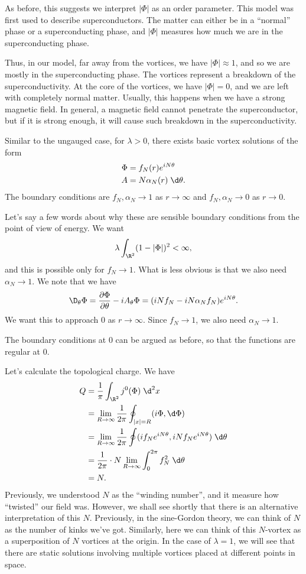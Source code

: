 \documentclass[a4paper]{article}
\begin{document}
As before, this suggests we interpret $|\Phi|$ as an order parameter. This model was first used to describe superconductors. The matter can either be in a ``normal'' phase or a superconducting phase, and $|\Phi|$ measures how much we are in the superconducting phase.

Thus, in our model, far away from the vortices, we have $|\Phi| \approx 1$, and so we are mostly in the superconducting phase. The vortices represent a breakdown of the superconductivity. At the core of the vortices, we have $|\Phi| = 0$, and we are left with completely normal matter. Usually, this happens when we have a strong magnetic field. In general, a magnetic field cannot penetrate the superconductor, but if it is strong enough, it will cause such breakdown in the superconductivity.

Similar to the ungauged case, for $\lambda > 0$, there exists basic vortex solutions of the form
\begin{align*}
  \Phi &= f_N(r) e^{iN\theta}\\
  A &= N \alpha_N(r) \;\d \theta.
\end{align*}
The boundary conditions are $f_N, \alpha_N \to 1$ as $r \to \infty$ and $f_N, \alpha_N\to 0$ as $r \to 0$.

Let's say a few words about why these are sensible boundary conditions from the point of view of energy. We want
\[
  \lambda \int_{\R^2} (1 - |\Phi|)^2 < \infty,
\]
and this is possible only for $f_N \to 1$. What is less obvious is that we also need $\alpha_N \to 1$. We note that we have
\[
  \D_\theta \Phi = \frac{\partial \Phi}{\partial \theta} - i A_\theta \Phi = (iN f_N - iN \alpha_N f_N) e^{iN\theta}.
\]
We want this to approach $0$ as $r \to \infty$. Since $f_N \to 1$, we also need $\alpha_N \to 1$.

The boundary conditions at $0$ can be argued as before, so that the functions are regular at $0$.

Let's calculate the topological charge. We have
\begin{align*}
  Q &= \frac{1}{\pi} \int_{\R^2} j^0(\Phi)\;\d^2 x \\
  &= \lim_{R \to \infty} \frac{1}{2\pi} \oint_{|x| = R} (i \Phi, \d \Phi) \\
  &= \lim_{R \to \infty} \frac{1}{2\pi} \oint (if_N e^{iN\theta}, iN f_N e^{iN\theta})\;\d \theta\\
  &= \frac{1}{2\pi} \cdot N \lim_{R \to \infty} \int_0^{2\pi} f_N^2 \;\d \theta\\
  &= N.
\end{align*}
Previously, we understood $N$ as the ``winding number'', and it measure how ``twisted'' our field was. However, we shall see shortly that there is an alternative interpretation of this $N$. Previously, in the sine-Gordon theory, we can think of $N$ as the number of kinks we've got. Similarly, here we can think of this $N$-vortex as a superposition of $N$ vortices at the origin. In the case of $\lambda = 1$, we will see that there are static solutions involving multiple vortices placed at different points in space.
\end{document}
